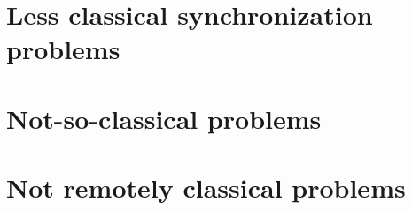 \documentclass{book}
\newcommand{\clearemptydoublepage}{\newpage\cleardoublepage}
\newif\ifnotcompact
\begin{document}
\chapter{Less classical synchronization problems}
\label{next}



\clearemptydoublepage
\chapter{Not-so-classical problems}



\clearemptydoublepage
\chapter{Not remotely classical problems}



\ifnotcompact
\chapter{Synchronization in Python}
\label{pysync}



\chapter{Synchronization in C}
\label{csync}



\fi

{}




\ifnotcompact
\appendix

\chapter{Cleaning up Python threads}
\label{cleanup}



\chapter{Cleaning up POSIX threads}
\label{ccleanup}



\fi
\end{document}
